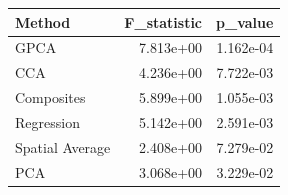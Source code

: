 \begin{tabular}{lrr}
\toprule
Method & F_statistic & p_value \\
\midrule
GPCA & 7.813e+00 & 1.162e-04 \\
CCA & 4.236e+00 & 7.722e-03 \\
Composites & 5.899e+00 & 1.055e-03 \\
Regression & 5.142e+00 & 2.591e-03 \\
Spatial Average & 2.408e+00 & 7.279e-02 \\
PCA & 3.068e+00 & 3.229e-02 \\
\bottomrule
\end{tabular}
